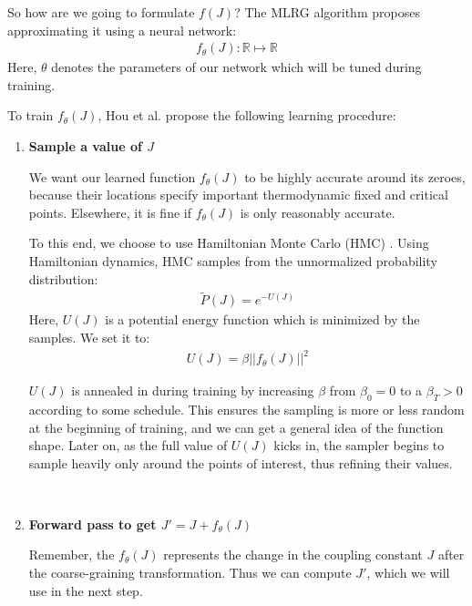 \documentclass[%
    reprint,
    amsmath,amssymb,
    aps,
]{revtex4-2}
\begin{document}
So how are we going to formulate $f(J)$? 
The MLRG algorithm proposes approximating \cite{universal-approximation, relu-approximation} it using a neural network:
\begin{eqnarray}
    \label{eqn:neural-network}
    f_\theta(J) : \mathbb{R} \mapsto \mathbb{R}
\end{eqnarray}
Here, $\theta$ denotes the parameters of our network which will be tuned during training. 

To train $f_\theta(J)$, Hou et al. \cite{mlrg} propose the following learning procedure: 
\begin{enumerate}
    \item{
        \textbf{Sample a value of $J$}

        We want our learned function $f_\theta(J)$ to be highly accurate around its zeroes, because their locations specify important thermodynamic fixed and critical points. 
        Elsewhere, it is fine if $f_\theta(J)$ is only reasonably accurate. 
        
        To this end, we choose to use Hamiltonian Monte Carlo (HMC) \cite{betancourt-hmc, duane-hmc}. 
        Using Hamiltonian dynamics, HMC samples from the unnormalized probability distribution:
        \begin{eqnarray}
            \label{eqn:hmc-distribution}
            \tilde{P}(J) = e^{-U(J)}
        \end{eqnarray}
        Here, $U(J)$ is a potential energy function which is minimized by the samples. 
        We set it to:
        \begin{eqnarray}
            \label{eqn:hmc-potential}
            U(J) = \beta || f_\theta(J) ||^2
        \end{eqnarray}
        
        $U(J)$ is annealed in during training by increasing $\beta$ from $\beta_0 = 0$ to a $\beta_T > 0$ according to some schedule. 
        This ensures the sampling is more or less random at the beginning of training, and we can get a general idea of the function shape. 
        Later on, as the full value of $U(J)$ kicks in, the sampler begins to sample heavily only around the points of interest, thus refining their values. 
    }\\
    
    \item{
        \textbf{Forward pass to get $J' = J + f_\theta(J)$}
        
        Remember, the $f_\theta(J)$ represents the change in the coupling constant $J$ after the coarse-graining transformation. 
        Thus we can compute $J'$, which we will use in the next step. 
    }\\
    

\end{enumerate}
\end{document}
